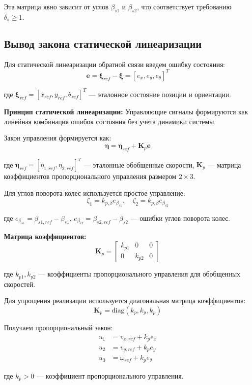 Эта матрица явно зависит от углов $\beta_{s1}$ и $\beta_{s2}$, что соответствует требованию $\delta_s \geq 1$.

\subsection{Вывод закона статической линеаризации}

Для статической линеаризации обратной связи введем ошибку состояния:
$$\mathbf{e} = \boldsymbol{\xi}_{ref} - \boldsymbol{\xi} = [e_x, e_y, e_\theta]^T$$

где $\boldsymbol{\xi}_{ref} = [x_{ref}, y_{ref}, \theta_{ref}]^T$ --- эталонное состояние позиции и ориентации.

\textbf{Принцип статической линеаризации:} Управляющие сигналы формируются как линейная комбинация ошибок состояния без учета динамики системы.

Закон управления формируется как:
$$\boldsymbol{\eta} = \boldsymbol{\eta}_{ref} + \mathbf{K}_p \mathbf{e}$$

где $\boldsymbol{\eta}_{ref} = [\eta_{1,ref}, \eta_{2,ref}]^T$ --- эталонные обобщенные скорости, $\mathbf{K}_p$ --- матрица коэффициентов пропорционального управления размером $2 \times 3$.

Для углов поворота колес используется простое управление:
$$\zeta_1 = k_{p,\beta} e_{\beta_{s1}}, \quad \zeta_2 = k_{p,\beta} e_{\beta_{s2}}$$

где $e_{\beta_{s1}} = \beta_{s1,ref} - \beta_{s1}$, $e_{\beta_{s2}} = \beta_{s2,ref} - \beta_{s2}$ --- ошибки углов поворота колес.

\textbf{Матрица коэффициентов:}
$$\mathbf{K}_p = \begin{bmatrix}
k_{p1} & 0 & 0 \\
0 & k_{p2} & 0
\end{bmatrix}$$

где $k_{p1}, k_{p2}$ --- коэффициенты пропорционального управления для обобщенных скоростей.

Для упрощения реализации используется диагональная матрица коэффициентов:
$$\mathbf{K}_p = \text{diag}(k_p, k_p, k_p)$$

Получаем пропорциональный закон:
\begin{align}
u_1 &= v_{x,ref} + k_p e_x \\
u_2 &= v_{y,ref} + k_p e_y \\
u_3 &= \omega_{ref} + k_p e_\theta
\end{align}

где $k_p > 0$ --- коэффициент пропорционального управления.

